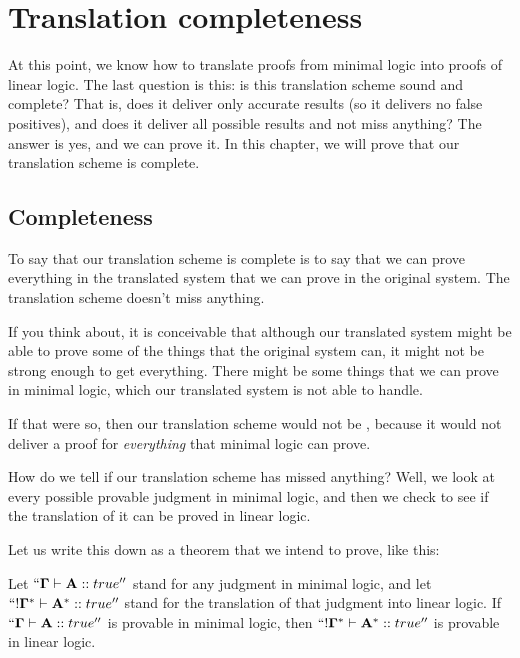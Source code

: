 \documentclass[../../../main.tex]{subfiles}
\begin{document}
\chapter{Translation completeness}

At this point, we know how to translate proofs from minimal logic into proofs of linear logic. The last question is this: is this translation scheme sound and complete? That is, does it deliver only accurate results (so it delivers no false positives), and does it deliver all possible results and not miss anything? The answer is yes, and we can prove it. In this chapter, we will prove that our translation scheme is complete.


\section{Completeness}

To say that our translation scheme is complete is to say that we can prove everything in the translated system that we can prove in the original system. The translation scheme doesn't miss anything.

If you think about, it is conceivable that although our translated system might be able to prove some of the things that the original system can, it might not be strong enough to get everything. There might be some things that we can prove in minimal logic, which our translated system is not able to handle. 

If that were so, then our translation scheme would not be , because it would not deliver a proof for \emph{everything} that minimal logic can prove.

How do we tell if our translation scheme has missed anything? Well, we look at every possible provable judgment in minimal logic, and then we check to see if the translation of it can be proved in linear logic. 

Let us write this down as a theorem that we intend to prove, like this:

\begin{theorem}[Completeness]
Let $``\nd{\Gamma} \ndturnstile/ \nd{A} :: true''$ stand for any judgment in minimal logic, and let $``\bang/\nd{\Gamma}^{*} \ndturnstile/ \nd{A}^{*} :: true''$ stand for the translation of that judgment into linear logic. If $``\nd{\Gamma} \ndturnstile/ \nd{A} :: true''$ is provable in minimal logic, then $``\bang/\nd{\Gamma}^{*} \ndturnstile/ \nd{A}^{*} :: true''$ is provable in linear logic.
\end{theorem}
\end{document}

